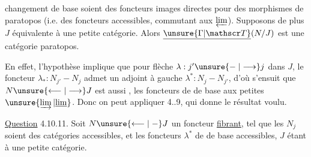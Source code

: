 changement de base soient des foncteurs images directes pour des morphismes de paratopos (i.e. des foncteurs accessibles, commutant aux  $\varprojlim$). Supposons de plus $J$ équivalente à une petite catégorie. Alors $\underline{\unsure{\Gamma|\mathscr T}}(N/J)$ est une catégorie paratopos.

En effet, l'hypothèse implique que pour  flèche $\lambda:j'\unsure{\mathrel{-}|\longrightarrow}j$ dans $J$, le foncteur $\lambda_*:N_{j'}\mathrel{-}N_j$ admet un adjoint à gauche $\lambda^*:N_j\mathrel{-}N_{j'}$, d'où s'ensuit que $N\unsure{\longleftarrow|\longrightarrow}J$ est aussi , les  foncteurs de  de base  aux petites $\unsure{\varinjlim|\underline{\lim}}$. Donc on peut appliquer 4..9, qui donne le résultat voulu.

\uline{Question} 4.10.11. Soit $N\unsure{\longleftarrow|\mathrel{-}}J$ un foncteur \uline{fibrant}, tel que les $N_j$ soient des catégories accessibles, et les foncteurs $\lambda^*$ de  de base accessibles, $J$ étant  à une petite catégorie. 

